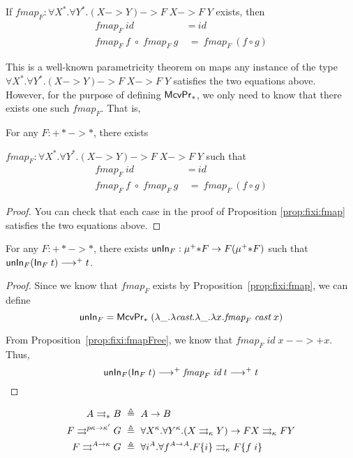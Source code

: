 \begin{proposition}\label{prop:fixi:fmapFree}
If $\textit{fmap}_F:\forall X^{*}.\forall Y^{*}.(X -> Y) -> F\;X -> F\;Y$
exists, then
\begin{align*}
\textit{fmap}_F~\textit{id} &~=~ \textit{id} \\
\textit{fmap}_F~\textit{f} \;\circ\; \textit{fmap}_F~\textit{g}
&~=~ \textit{fmap}_F~(f\circ g)
\end{align*}
\end{proposition}\noindent
This is a well-known parametricity theorem on maps any instance of the type
$\forall X^{*}.\forall Y^{*}.(X -> Y) -> F\;X -> F\;Y$ satisfies
the two equations above. However, for the purpose of defining $\mathsf{McvPr}_{*}$,
we only need to know that there exists one such $\textit{fmap}_F$. That is,
\begin{proposition}\label{prop:fixi:fmapHom}
For any $F : +* -> *$, there exists

$\textit{fmap}_F:\forall X^{*}.\forall Y^{*}.(X -> Y) -> F\;X -> F\;Y$
such that
\begin{align*}
\textit{fmap}_F~\textit{id} &~=~ \textit{id} \\
\textit{fmap}_F~\textit{f} \;\circ\; \textit{fmap}_F~\textit{g}
&~=~ \textit{fmap}_F~(f\circ g)
\end{align*}
\end{proposition}
\begin{proof}
	You can check that each case
	in the proof of Proposition \ref{prop:fixi:fmap}
	satisfies the two equations above.
\end{proof}

\begin{proposition} For any $F : +* -> *$, there exists
$\mathsf{unIn}_F : \mu^{+}{*} F -> F(\mu^{+}{*} F)$ such that
$\mathsf{unIn}_F (\mathsf{In}_F\;t) -->+ t$.
\end{proposition}
\begin{proof}
Since we know that $\textit{fmap}_F$ exists by Proposition~\ref{prop:fixi:fmap},
we can define
\[ \mathsf{unIn}_F = \mathsf{McvPr}_{*}\;
            (\lambda\_.\lambda\textit{cast}.\lambda\_.\lambda x.\textit{fmap}_F\;\textit{cast}\;x)
\]

From Proposition~\ref{prop:fixi:fmapFree}, we know that
$\textit{fmap}_F\;\textit{id}\;x -->+ x$.
Thus,
\[ \mathsf{unIn}_F (\mathsf{In}_F\;t) -->+ \textit{fmap}_F\;\textit{id}\;t -->+ t \]
\end{proof}

\begin{align*}
A \rightrightarrows_{*} B &~\triangleq~ A -> B \\
F \rightrightarrows^{p\kappa -> \kappa'} G &~\triangleq~
	\forall X^\kappa.\forall Y^\kappa.
		(X \rightrightarrows_\kappa Y) -> F X \rightrightarrows_\kappa F Y \\
F \rightrightarrows^{A -> \kappa} G &~\triangleq~
	\forall i^A.\forall f^{A->A}. F\{i\} \rightrightarrows_\kappa F\{f\;i\}
\end{align*}


